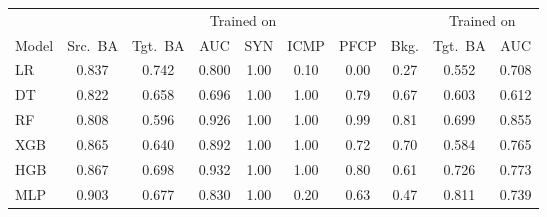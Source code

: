 \begin{tabular}{lccccccccc}
\toprule
 & \multicolumn{7}{c}{Trained on \DA{}} & \multicolumn{2}{c}{Trained on \DB{}} \\
\cmidrule(lr){2-8}\cmidrule(lr){9-10}
Model & Src.\ BA & Tgt.\ BA & AUC & SYN & ICMP & PFCP & Bkg. & Tgt.\ BA & AUC \\
\midrule
LR & 0.837 & 0.742 & 0.800 & 1.00 & 0.10 & 0.00 & 0.27 & 0.552 & 0.708 \\
DT & 0.822 & 0.658 & 0.696 & 1.00 & 1.00 & 0.79 & 0.67 & 0.603 & 0.612 \\
RF & 0.808 & 0.596 & 0.926 & 1.00 & 1.00 & 0.99 & 0.81 & 0.699 & 0.855 \\
XGB & 0.865 & 0.640 & 0.892 & 1.00 & 1.00 & 0.72 & 0.70 & 0.584 & 0.765 \\
HGB & 0.867 & 0.698 & 0.932 & 1.00 & 1.00 & 0.80 & 0.61 & 0.726 & 0.773 \\
MLP & 0.903 & 0.677 & 0.830 & 1.00 & 0.20 & 0.63 & 0.47 & 0.811 & 0.739 \\
\bottomrule
\end{tabular}
